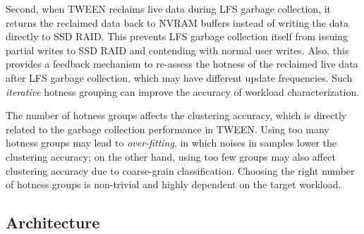 
Second, when TWEEN reclaims live data during LFS garbage collection, it
returns the reclaimed data back to NVRAM buffers instead of writing the data
directly to SSD RAID.  
This prevents LFS garbage
collection itself from issuing partial writes to SSD RAID and contending with
normal user writes.  Also, this provides a feedback mechanism to re-assess
the hotness of the reclaimed live data after LFS garbage collection, which may
have different update frequencies.  Such {\em iterative} hotness grouping can
improve the accuracy of workload characterization.  

The number of hotness groups affects the clustering accuracy, which is
directly related to the garbage collection performance in TWEEN. Using too
many hotness groups may lead to \textit{over-fitting}, in which noises in
samples lower the clustering accuracy; on the other hand, using too few groups
may also affect clustering accuracy due to coarse-grain classification. 
Choosing the right number of hotness groups is non-trivial and highly
dependent on the target workload. 

\subsection{Architecture}
\label{subsec:architecture}

